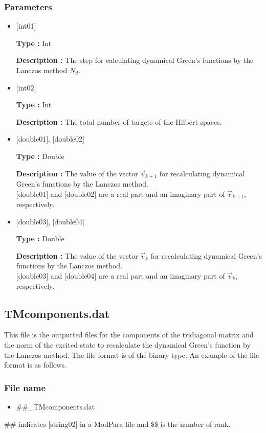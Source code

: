 \subsubsection{Parameters}
 \begin{itemize}

  \item  $[$int01$]$

 {\bf Type :} Int

 {\bf Description :} The step for calculating dynamical Green's functions by the Lanczos method $N_d$.

  \item  $[$int02$]$

 {\bf Type :} Int

{\bf Description :}  The total number of targets of the Hilbert spaces.

 
 \item  $[$double01$]$, $[$double02$]$

 {\bf Type :} Double 

{\bf Description :} The value of the vector $\vec{v}_{k+1}$ for recalculating dynamical Green's functions by the Lanczos method.\\
$[$double01$]$ and $[$double02$]$ are a real part and an imaginary part of $\vec{v}_{k+1}$, respectively.

\item  $[$double03$]$, $[$double04$]$

 {\bf Type :} Double 

{\bf Description :} The value of the vector $\vec{v}_{k}$ for recalculating dynamical Green's functions by the Lanczos method.\\
$[$double03$]$ and $[$double04$]$ are a real part and an imaginary part of $\vec{v}_{k}$, respectively.
\end{itemize}

\newpage
\subsection{{TMcomponents.dat}}
This file is the outputted files for the components of the tridiagonal matrix and the norm of the excited state to recalculate  the dynamical Green's function by the Lanczos method.  The file format is of the binary type. An example of the file format is as follows.

\subsubsection{File name}
\begin{itemize}
   \item{\#\#\_TMcomponents.dat}
\end{itemize}
\#\# indicates [string02] in a ModPara file and \$\$ is the number of rank. 

